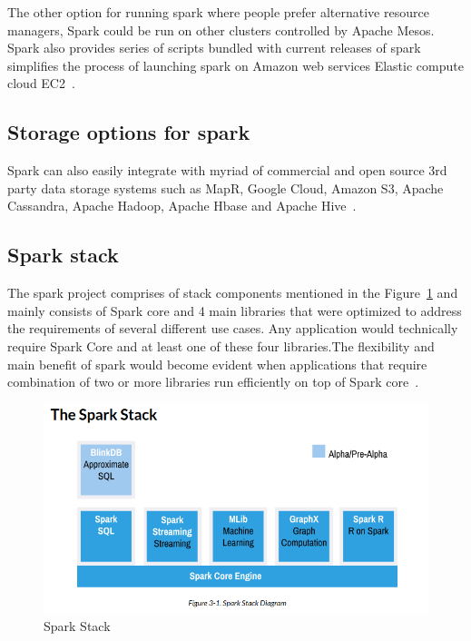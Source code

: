 The other option for running spark where people prefer alternative resource 
managers, Spark could be run on other clusters controlled by Apache Mesos.
Spark also provides series of scripts bundled with current releases of spark 
simplifies the process of launching spark on Amazon web services Elastic 
compute cloud EC2~\cite{hid-sp18-410-spark-architecture}.

\subsection{Storage options for spark}

Spark can also easily integrate with myriad of commercial and open source 3rd 
party data storage systems such as MapR, Google Cloud, Amazon S3, Apache 
Cassandra, Apache Hadoop, Apache Hbase and Apache Hive~\cite{hid-sp18-410-spark-architecture}.


\subsection{Spark stack}


The spark project comprises of stack components mentioned in the 
Figure~\ref{fig:spark-stack} and mainly consists of Spark core and 
4 main libraries that were optimized to address the requirements 
of several different use cases.
Any application would technically require Spark Core and at least one of these 
four libraries.The flexibility and main benefit of spark would become evident 
when applications that require combination of two or more libraries run 
efficiently on top of Spark core~\cite{hid-sp18-410-spark-architecture}.





\begin{figure}[!ht]
  \centering\includegraphics[width=\columnwidth]{images/spark-stack.png}
   \caption{Spark Stack 
   ~\cite{hid-sp18-410-spark-architecture}}\label{fig:spark-stack}
\end{figure}




